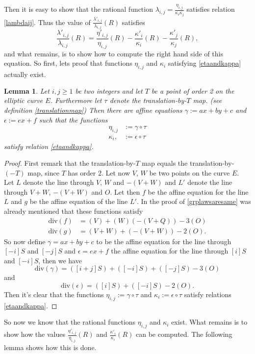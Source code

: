 \documentclass{article}
\numberwithin{equation}{section}
\newtheorem{lemma}[theorem]{Lemma}
\theoremstyle{definition}
\begin{document}
Then it is easy to show that the rational function $\lambda_{i,j}=\frac{\eta_{i,j}}{\kappa_i\kappa_j}$ satisfies relation \ref{lambdaij}. Thus the value of $\frac{\lambda'_{i,j}}{\lambda_{i,j}}(R)$ satisfies $$\frac{\lambda'_{i,j}}{\lambda_{i,j}}(R)=\frac{\eta'_{i,j}}{\eta_{i,j}}(R)-\frac{\kappa'_i}{\kappa_i}(R)-\frac{\kappa'_j}{\kappa_j}(R),$$ and what remains, is to show how to compute the right hand side of this equation.
So first, lets proof that functions $\eta_{i,j}$ and $\kappa_i$ satisfying \ref{etaandkappa} actually exist.

\begin{lemma}
Let $i,j\geq 1$ be two integers and let $T$ be a point of order 2 on the elliptic curve $E$. Furthermore let $\tau$ denote the translation-by-$T$ map. (see definition \ref{translationmap}) Then there are affine equations $\gamma := ax+by+c$ and $\epsilon:=ex+f$ such that the functions \begin{align*}
\eta_{i,j} &:= \gamma \circ \tau \\ \kappa_i, &:= \epsilon \circ \tau
\end{align*} satisfy relation \ref{etaandkappa}.
\end{lemma}

\begin{proof}
First remark that the translation-by-$T$ map equals the translation-by-$(-T)$ map, since $T$ has order $2$. Let now $V$, $W$ be two points on the curve $E$. Let $L$ denote the line through $V$, $W$ and $-(V+W)$ and $L'$ denote the line through $V+W$, $-(V+W)$ and $O$. Let then $f$ be the affine equation for the line $L$ and $g$ be the affine equation of the line $L'$. In the proof of \ref{grplawsaresame} was already mentioned that these functions satisfy 
\begin{align*}
\text{div}(f) &= (V)+(W)(-(V+Q))-3(O)\\
\text{div}(g) &= (V+W)+(-(V+W)) -2(O).
\end{align*}
So now define $\gamma=ax+by+c$ to be the affine equation for the line through $[-i]S$ and $[-j]S$ and $\epsilon=ex+f$ the affine equation for the line through $[i]S$ and $[-i]S$, then we have $$\text{div}(\gamma)=([i+j]S)+([-i]S)+([-j]S)-3(O)$$ and $$\text{div}(\epsilon)=([i]S)+([-i]S)-2(O).$$ Then it's clear that the functions $\eta_{i,j}:=\gamma \circ \tau$ and $\kappa_i:=\epsilon \circ \tau$ satisfy relations \ref{etaandkappa}.  
\end{proof}

So now we know that the rational functions $\eta_{i,j}$ and $\kappa_i$ exist. What remains is to show how the values $\frac{\eta'_{i,j}}{\eta_{i,j}}(R)$ and $\frac{\kappa'_i}{\kappa_i}(R)$ can be computed. The following lemma shows how this is done.
\end{document}
